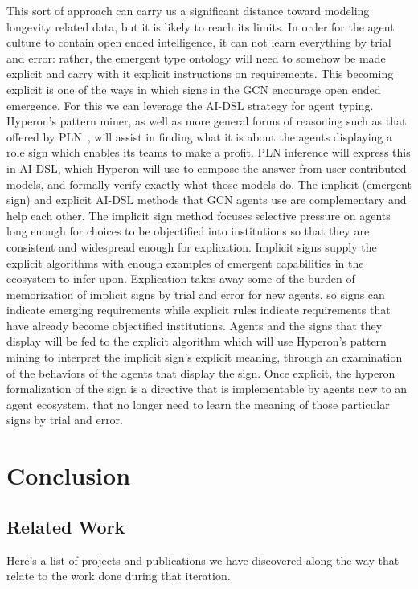 \documentclass[]{report}
\begin{document}
This sort of approach can carry us a significant distance toward
modeling longevity related data, but it is likely to reach its
limits. In order for the agent culture to contain open ended
intelligence, it can not learn everything by trial and error: rather,
the emergent type ontology will need to somehow be made explicit and
carry with it explicit instructions on requirements. This becoming
explicit is one of the ways in which signs in the GCN encourage open
ended emergence. For this we can leverage the AI-DSL strategy for
agent typing.  Hyperon’s pattern miner, as well as more general forms
of reasoning such as that offered by PLN~\cite{Goertzel09PLN}, will
assist in finding what it is about the agents displaying a role sign
which enables its teams to make a profit.  PLN inference will express
this in AI-DSL, which Hyperon will use to compose the answer from user
contributed models, and formally verify exactly what those models do.
The implicit (emergent sign) and explicit AI-DSL methods that GCN
agents use are complementary and help each other. The implicit sign
method focuses selective pressure on agents long enough for choices to
be objectified into institutions so that they are consistent and
widespread enough for explication. Implicit signs supply the explicit
algorithms with enough examples of emergent capabilities in the
ecosystem to infer upon. Explication takes away some of the burden of
memorization of implicit signs by trial and error for new agents, so
signs can indicate emerging requirements while explicit rules indicate
requirements that have already become objectified institutions. Agents
and the signs that they display will be fed to the explicit algorithm
which will use Hyperon's pattern mining to interpret the implicit
sign's explicit meaning, through an examination of the behaviors of
the agents that display the sign. Once explicit, the hyperon
formalization of the sign is a directive that is implementable by
agents new to an agent ecosystem, that no longer need to learn the
meaning of those particular signs by trial and error.

\chapter{Conclusion}

\section{Related Work}
\label{sec:related_work}

Here's a list of projects and publications we have discovered along
the way that relate to the work done during that iteration.
\end{document}
